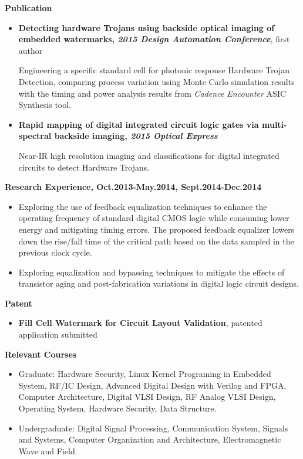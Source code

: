 \documentclass[]{article}
\begin{document}
\noindent \textbf{Publication}
\begin{itemize}
    \item \textbf{Detecting hardware Trojans using backside optical imaging of
    embedded watermarks, \textit{2015 Design Automation Conference}}, first author
    
    Engineering a specific standard cell for photonic response Hardware Trojan Detection, comparing
    process variation using Monte Carlo simulation results with the timing and power analysis
    results from \textit{Cadence Encounter} ASIC Synthesis tool.

    \item \textbf{Rapid mapping of digital integrated circuit logic gates via multi-spectral backside
    imaging, \textit{2015 Optical Express}}

    Near-IR high resolution imaging and classifications for digital integrated circuits to detect
    Hardware Trojans.
\end{itemize}

\noindent \textbf{Research Experience, Oct.2013-May.2014, Sept.2014-Dec.2014}
		\begin{itemize}
            \item Exploring the use of feedback equalization techniques to
            enhance the operating frequency of standard digital CMOS logic
            while consuming lower energy and mitigating timing errors. The
            proposed feedback equalizer lowers down the rise/fall time of
            the critical path based on the data sampled in the previous
            clock cycle. 

            \item Exploring equalization and bypassing techniques to mitigate
            the effects of transistor aging and post-fabrication
            variations in digital logic circuit designs.
		
        \end{itemize}


\noindent \textbf{Patent}
\begin{itemize}
    \item \textbf{Fill Cell Watermark for Circuit Layout Validation}, patented application submitted
\end{itemize}

\noindent \textbf{Relevant Courses}
\begin{itemize}
\item Graduate:
                    Hardware Security, Linux Kernel Programing in Embedded System, RF/IC Design,
                    Advanced Digital Design with Verilog and FPGA, Computer
                    Architecture, Digital VLSI Design, RF Analog VLSI Design,
                    Operating System, Hardware Security, Data Structure.
\item Undergraduate:
                    Digital Signal Processing, Communication System, Signals
                    and Systems, Computer Organization and 
                    Architecture, Electromagnetic Wave and Field. 
\end{itemize}
\end{document}
